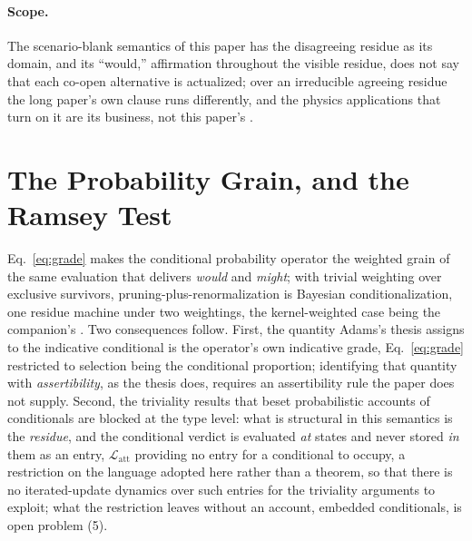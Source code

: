 \paragraph{Scope.} The scenario-blank semantics of this paper has the disagreeing residue as its domain, and its ``would,'' affirmation throughout the visible residue, does not say that each co-open alternative is actualized; over an irreducible agreeing residue the long paper's own clause runs differently, and the physics applications that turn on it are its business, not this paper's \parencite{Aethus}.


\section{The Probability Grain, and the Ramsey Test}\label{sec:probability}

Eq.~\eqref{eq:grade} makes the conditional probability operator the weighted grain of the same evaluation that delivers \emph{would} and \emph{might}; with trivial weighting over exclusive survivors, pruning-plus-renormalization is Bayesian conditionalization, one residue machine under two weightings, the kernel-weighted case being the companion's \parencite{Aethus}. Two consequences follow. First, the quantity Adams's thesis assigns to the indicative conditional \parencite{adams1975} is the operator's own indicative grade, Eq.~\eqref{eq:grade} restricted to selection being the conditional proportion; identifying that quantity with \emph{assertibility}, as the thesis does, requires an assertibility rule the paper does not supply. Second, the triviality results that beset probabilistic accounts of conditionals \parencite{gardenfors1986} are blocked at the type level: what is structural in this semantics is the \emph{residue}, and the conditional verdict is evaluated \emph{at} states and never stored \emph{in} them as an entry, $\mathcal{L}_{\mathrm{att}}$ providing no entry for a conditional to occupy, a restriction on the language adopted here rather than a theorem, so that there is no iterated-update dynamics over such entries for the triviality arguments to exploit; what the restriction leaves without an account, embedded conditionals, is open problem (5).

